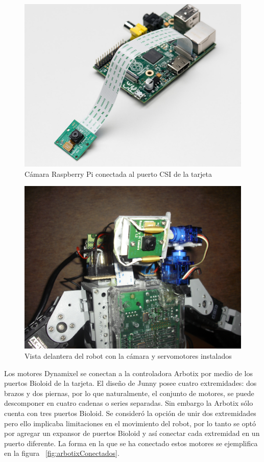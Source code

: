 \begin{figure}[hbtp]
\centering
\includegraphics[scale=0.6]{imagenes/raspbCam.jpg}
\caption{C\'amara Raspberry Pi conectada al puerto CSI de la tarjeta}
\label{fig:camACSI}
\end{figure}
 
\begin{figure}[hbtp]
\centering
\includegraphics[scale=0.08]{imagenes/servosYcamara.JPG}
\caption{Vista delantera del robot con la cámara y servomotores instalados}
\label{fig:servosycam}
\end{figure}

Los motores Dynamixel se conectan a la controladora Arbotix por medio de los puertos Bioloid de la tarjeta. El diseño de Junny posee cuatro extremidades: dos brazos y dos piernas, por lo que naturalmente, el conjunto de motores, se puede descomponer en cuatro cadenas o series separadas. Sin embargo la Arbotix s\'olo cuenta con tres puertos Bioloid. Se consideró la opción de unir dos extremidades pero ello implicaba limitaciones en el movimiento del robot, por lo tanto se optó por agregar un expansor de puertos Bioloid y así conectar cada extremidad en un puerto diferente. La forma en la que se ha conectado estos motores se ejemplifica en la figura ~\ref{fig:arbotixConectados}. 

